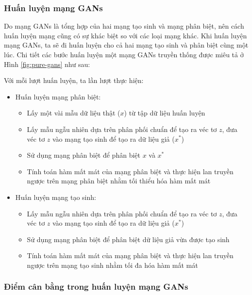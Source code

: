 \subsubsection{Huấn luyện mạng GANs}

Do mạng GANs là tổng hợp của hai mạng tạo sinh và mạng phân biệt, nên cách huấn luyện mạng cũng có sự khác biệt so với các loại mạng khác. Khi huấn luyện mạng GANs, ta sẽ đi huấn luyện cho cả hai mạng tạo sinh và phân biệt cùng một lúc. Chi tiết các bước huấn luyện một mạng GANs truyền thống được miêu tả ở Hình \ref{fig:pure-gans} như sau:

Với mỗi lượt huấn luyện, ta lần lượt thực hiện:
\begin{itemize}
    \item Huấn luyện mạng phân biệt:
    \begin{itemize}
        \item Lấy một vài mẫu dữ liệu thật ($x$) từ tập dữ liệu huấn luyện
        \item Lấy mẫu ngẫu nhiên dựa trên phân phối chuẩn để tạo ra véc tơ $z$, đưa véc tơ $z$ vào mạng tạo sinh để tạo ra dữ liệu giả ($x^*$)
        \item Sử dụng mạng phân biệt để phân biệt $x$ và $x^*$
        \item Tính toán hàm mất mát của mạng phân biệt và thực hiện lan truyền ngược trên mạng phân biệt nhằm tối thiểu hóa hàm mất mát
    \end{itemize}

    \item Huấn luyện mạng tạo sinh:
    \begin{itemize}
        \item Lấy mẫu ngẫu nhiên dựa trên phân phối chuẩn để tạo ra véc tơ $z$, đưa véc tơ $z$ vào mạng tạo sinh để tạo ra dữ liệu giả ($x^*$)
        \item Sử dụng mạng phân biệt để phân biệt dữ liệu giả vừa được tạo sinh
        \item Tính toán hàm mất mát của mạng phân biệt và thực hiện lan truyền ngược trên mạng tạo sinh nhằm tối đa hóa hàm mất mát
    \end{itemize}
\end{itemize}

\subsubsection{Điểm cân bằng trong huấn luyện mạng GANs}


